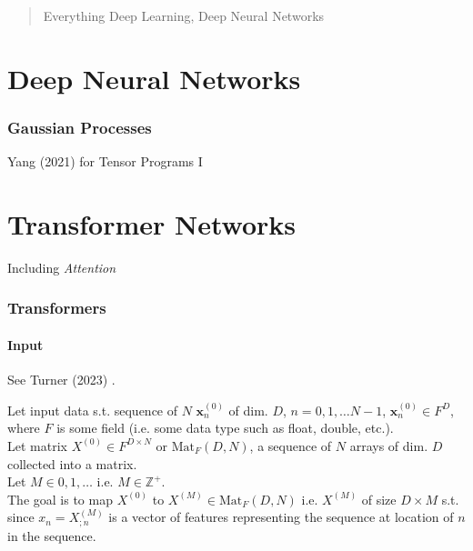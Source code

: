 \documentclass[10pt]{amsart}
\begin{document}
		
\begin{multicols*}{2}
		
\setcounter{tocdepth}{1}
\tableofcontents
		
\begin{abstract}
Everything Deep Learning, Deep Neural Networks
\end{abstract}
		
\part{Deep Neural Networks}

\section{Gaussian Processes}
Yang (2021) for Tensor Programs I\cite{Yang2021}

\part{Transformer Networks}

Including \emph{Attention}

\section{Transformers}

\subsection{Input}

See Turner (2023) \cite{Turn2023}.

Let input data s.t. sequence of $N$ $\mathbf{x}^{(0)}_n$ of dim. $D$, $n = 0,1, \dots N-1$, $\mathbf{x}_n^{(0)} \in F^D$, where $F$ is some field (i.e. some data type such as float, double, etc.). \\

Let matrix $X^{(0)} \in F^{D\times N}$ or $\text{Mat}_F(D, N)$, a sequence of $N$ arrays of dim. $D$ collected into a matrix. \\

Let $M \in 0,1,\dots $ i.e. $M \in \mathbb{Z}^+$. \\

The goal is to map $X^{(0)}$ to $X^{(M)} \in \text{Mat}_F(D,N)$ i.e. $X^{(M)}$ of size $D\times M$ s.t. since $x_n = X_{;n}^{(M)}$ is a vector of features representing the sequence at location of $n$ in the sequence.


\end{multicols*}
\end{document}
